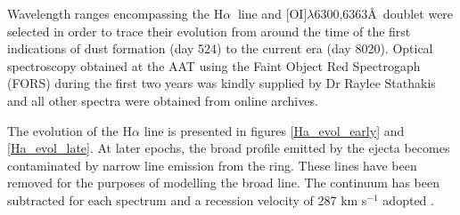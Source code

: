 \documentclass[useAMS,usenatbib,usegraphicx]{mnras}
\begin{document}
Wavelength ranges encompassing  the H$\alpha\ $ line and [OI]$\lambda$6300,6363\AA\ doublet  were selected in order to trace their evolution from around the time of the first indications of dust formation (day 524) to the current era (day 8020).  Optical spectroscopy obtained at the AAT using the Faint Object Red Spectrogaph (FORS) during the first two years was kindly supplied by Dr Raylee Stathakis \citep{Spyromilio1991, Spyromilio1993a, Hanuschik1993} and all other spectra were obtained from online archives.

The evolution of the H$\alpha$ line is presented in figures \ref{Ha_evol_early} and \ref{Ha_evol_late}.  At later epochs, the broad profile emitted by the ejecta becomes contaminated by narrow line emission from the ring.  These lines have been removed for the purposes of modelling the broad line.  The continuum has been subtracted for each spectrum and a recession velocity of 287 km s$^{-1}$ adopted \citep{Groningsson2008}.
\end{document}
